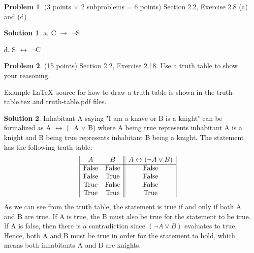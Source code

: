 \documentclass{article}
\theoremstyle{definition}
\newtheorem{problem}{Problem}
\newtheorem*{solution}{Solution}
\begin{document}
\newpage
\begin{problem} (3 points $\times$ 2 subproblems = 6 points) Section 2.2, Exercise 2.8 (a) and (d)
\end{problem}
\begin{solution}
a. C $\rightarrow$ $\neg$S

d. S $\leftrightarrow$ $\neg$C
\end{solution}

\newpage
\begin{problem} (15 points) Section 2.2, Exercise 2.18.
Use a truth table to show your reasoning. 

Example \LaTeX\ source for how to draw a truth table is shown 
in the truth-table.tex and truth-table.pdf files.
\end{problem}
\begin{solution}
Inhabitant A saying "I am a knave or B is a knight" can be formalized as A $\leftrightarrow$ ($\neg$A $\lor$ B) where A being true represents inhabitant A is a knight and B being true represents inhabitant B being a knight.
The statement has the following truth table:
\begin{displaymath}
\begin{array}{|c c||c|}
A & B & A \leftrightarrow (\neg A \lor B)\\
\hline
\text{False} & \text{False} & \text{False} \\
\text{False} & \text{True} & \text{False} \\
\text{True} & \text{False} & \text{False} \\
\text{True} & \text{True} & \text{True} \\
\end{array}
\end{displaymath}
As we can see from the truth table, the statement is true if and only if both A and B are true. If A is true, the B must also be true for the statement to be true. If A is false, then there is a contradiction since $(\neg A \lor B)$ evaluates to true. Hence, both A and B must be true in order for the statement to hold, which means both inhabitants A and B are knights.
\end{solution}
\end{document}

